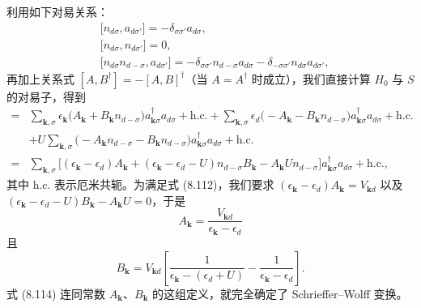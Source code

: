 利用如下对易关系：
\begin{equation*}
\begin{aligned}
& \big[ n_{d\sigma}, a_{d\sigma'} \big] = -\delta_{\sigma\sigma'} a_{d\sigma}, \\
& \big[ n_{d\sigma}, n_{d\sigma'} \big] = 0, \\
& \big[ n_{d\sigma} n_{d-\sigma}, a_{d\sigma'} \big] = -\delta_{\sigma\sigma'} n_{d-\sigma} a_{d\sigma} - \delta_{-\sigma\sigma'} n_{d\sigma} a_{d\sigma'},
\end{aligned}
\tag{8.115}
\end{equation*}
再加上关系式 $[A, B^{\dagger}] = -[A, B]^{\dagger}$（当 $A = A^{\dagger}$ 时成立），我们直接计算 $H_{0}$ 与 $S$ 的对易子，得到
\begin{align*}
[H_{0}, S] = {} & \sum_{\mathbf{k},\sigma} \epsilon_{\mathbf{k}} \big( A_{\mathbf{k}} + B_{\mathbf{k}} n_{d-\sigma} \big) a_{\mathbf{k}\sigma}^{\dagger} a_{d\sigma} + \mathrm{h.c.} + \sum_{\mathbf{k},\sigma} \epsilon_{d} \big( -A_{\mathbf{k}} - B_{\mathbf{k}} n_{d-\sigma} \big) a_{\mathbf{k}\sigma}^{\dagger} a_{d\sigma} + \mathrm{h.c.} \\
& + U \sum_{\mathbf{k},\sigma} \big( -A_{\mathbf{k}} n_{d-\sigma} - B_{\mathbf{k}} n_{d-\sigma} \big) a_{\mathbf{k}\sigma}^{\dagger} a_{d\sigma} + \mathrm{h.c.} \\
= {} & \sum_{\mathbf{k},\sigma} \big[ (\epsilon_{\mathbf{k}} - \epsilon_{d}) A_{\mathbf{k}} + (\epsilon_{\mathbf{k}} - \epsilon_{d} - U) n_{d-\sigma} B_{\mathbf{k}} - A_{\mathbf{k}} U n_{d-\sigma} \big] a_{\mathbf{k}\sigma}^{\dagger} a_{d\sigma} + \mathrm{h.c.}, \tag{8.116}
\end{align*}
其中 h.c. 表示厄米共轭。为满足式 (8.112)，我们要求 $(\epsilon_{\mathbf{k}} - \epsilon_{d}) A_{\mathbf{k}} = V_{\mathbf{k}d}$ 以及 $(\epsilon_{\mathbf{k}} - \epsilon_{d} - U) B_{\mathbf{k}} - A_{\mathbf{k}} U = 0$，于是
\begin{equation*}
A_{\mathbf{k}} = \frac{V_{\mathbf{k}d}}{\epsilon_{\mathbf{k}} - \epsilon_{d}}
\end{equation*}
且
\begin{equation*}
B_{\mathbf{k}} = V_{\mathbf{k}d} \left[ \frac{1}{\epsilon_{\mathbf{k}} - (\epsilon_{d} + U)} - \frac{1}{\epsilon_{\mathbf{k}} - \epsilon_{d}} \right].
\end{equation*}
式 (8.114) 连同常数 $A_{\mathbf{k}}$、$B_{\mathbf{k}}$ 的这组定义，就完全确定了 Schrieffer--Wolff 变换。


